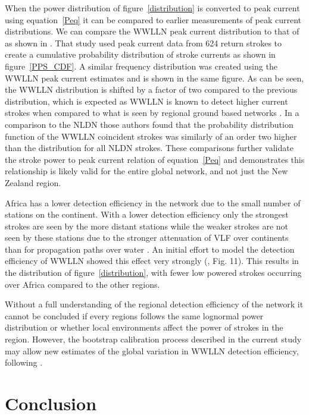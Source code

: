 \documentclass[12pt]{article}
\begin{document}
When the power distribution of figure~\ref{distribution} is converted to peak current using equation~\ref{Peq} it can be compared to earlier measurements of peak current distributions. We can compare the WWLLN peak current distribution to that of \citet{Popolansky1972} as shown in \citet{Golde1977}. That study used peak current data from 624 return strokes to create a cumulative probability distribution of stroke currents as shown in figure~\ref{PPS_CDF}. A similar frequency distribution was created using the WWLLN peak current estimates and is shown in the same figure. As can be seen, the WWLLN distribution is shifted by a factor of two compared to the previous distribution, which is expected as WWLLN is known to detect higher current strokes when compared to what is seen by regional ground based networks \citep{Abarca2010}. In a comparison to the NLDN those authors found that the probability distribution function of the WWLLN coincident strokes was similarly of an order two higher than the distribution for all NLDN strokes. These comparisons further validate the stroke power to peak current relation of equation~\ref{Peq} and demonstrates this relationship is likely valid for the entire global network, and not just the New Zealand region.



Africa has a lower detection efficiency in the network due to the small number of stations on the continent. With a lower detection efficiency only the strongest strokes are seen by the more distant stations while the weaker strokes are not seen by these stations due to the stronger attenuation of VLF over continents than for propagation paths over water \citep{Wait1970}. An initial effort to model the detection efficiency of WWLLN showed this effect very strongly (\citet{Rodger2006}, Fig. 11). This results in the distribution of figure~\ref{distribution}, with fewer low powered strokes occurring over Africa compared to the other regions.

Without a full understanding of the regional detection efficiency of the network it cannot be concluded if every regions follows the same lognormal power distribution or whether local environments affect the power of strokes in the region. However, the bootstrap calibration process described in the current study may allow new estimates of the global variation in WWLLN detection efficiency, following \citet{Rodger2006}.

\section{Conclusion}
\end{document}
